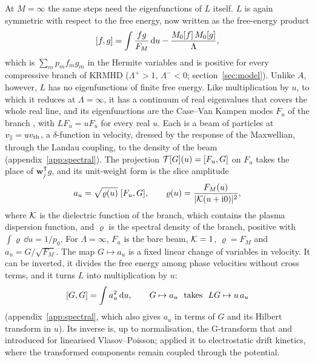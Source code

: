 At $M=\infty$ the same steps need the eigenfunctions of $L$ itself. $L$ is again symmetric with respect to the free energy, now written as the free-energy product
\begin{equation}\label{eq:fe}
  [f,g]=\int\frac{fg}{F_M}\,\mathrm{d} u-\frac{M_0[f]\,M_0[g]}{\Lambda},
\end{equation}
which is $\sum_mp_mf_mg_m$ in the Hermite variables and is positive for every compressive branch of KRMHD ($\Lambda^+>1$, $\Lambda^-<0$; section~\ref{sec:model}). Unlike $A$, however, $L$ has no eigenfunctions of finite free energy. Like multiplication by $u$, to which it reduces at $\Lambda=\infty$, it has a continuum of real eigenvalues that covers the whole real line, and its eigenfunctions are the Case--Van Kampen modes $F_u$ of the branch \citep{vanKampen1955,Case1959}, with $LF_u=uF_u$ for every real $u$. Each is a beam of particles at $v_\parallel=uv_{\mathrm{th}}$, a $\delta$-function in velocity, dressed by the response of the Maxwellian, through the Landau coupling, to the density of the beam (appendix~\ref{app:spectral}). The projection $\mathcal T[G](u)=[F_u,G]$ on $F_u$ takes the place of $\boldsymbol w_j^{\mathsf T}g$, and its unit-weight form is the slice amplitude
\begin{equation}\label{eq:aunit}
  a_u=\sqrt{\varrho(u)}\;[F_u,G],\qquad \varrho(u)=\frac{F_M(u)}{|\mathcal K(u+\mathrm{i}0)|^2},
\end{equation}
where $\mathcal K$ is the dielectric function of the branch, which contains the plasma dispersion function, and $\varrho$ is the spectral density of the branch, positive with $\int\varrho\,\dd u=1/p_0$. For $\Lambda=\infty$, $F_u$ is the bare beam, $\mathcal K=1$, $\varrho=F_M$ and $a_u=G/\sqrt{F_M}$. The map $G\mapsto a_u$ is a fixed linear change of variables in velocity. It can be inverted, it divides the free energy among phase velocities without cross terms, and it turns $L$ into multiplication by $u$:
\begin{equation}\label{sl:parseval}
  \fe{G}{G}=\int a_u^2\,\dd u,\qquad G\mapsto a_u\ \text{ takes }\ LG\mapsto u\,a_u
\end{equation}
(appendix~\ref{app:spectral}, which also gives $a_u$ in terms of $G$ and its Hilbert transform in $u$). Its inverse is, up to normalisation, the G-transform that \citet{MorrisonPfirsch1992} and \citet{Morrison2000} introduced for linearised Vlasov--Poisson; \citet{Heninger2018} applied it to electrostatic drift kinetics, where the transformed components remain coupled through the potential.

